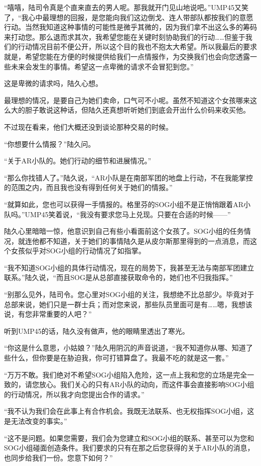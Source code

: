 “嘻嘻，陆司令真是个直来直去的男人呢。那我就开门见山地说吧。”UMP45又笑了，“我心中最理想的回报，是您能向我们这边倒戈、连人带部队都按我们的意愿行动。当然我知道这种事情的可能性是微乎其微的，因为我们拿不出这么多的筹码来打动您。那么退而求其次，我希望您能在关键时刻协助我们的行动……但鉴于我们的行动情况目前不便公开，所以这个目的我也不抱太大希望。所以我最后的要求就是，希望您能在方便的时候提供给我们一点情报作，为交换我们也会向您透露一些未来会发生的事情。希望这一点卑微的请求不会冒犯到您。”

这是卑微的请求吗，陆久心想。

最理想的情况，是要自己为她们卖命，口气可不小呢。虽然不知道这个女孩哪来这么大的胆子敢说这种话，但陆久还真想听听她们到底会开出什么价码来收买他。

不过现在看来，他们大概还没到谈论那种交易的时候。

“你想要什么情报？”陆久问。

“关于AR小队的。她们行动的细节和进展情况。”

“那么你找错人了。”陆久说，“AR小队是在南部军团的地盘上行动，不在我能掌控的范围之内，而且我也没有得到任何关于她们的情报。”

“就算如此，您也可以获得一手情报的。格里芬的SOG小组不是正悄悄跟着AR小队吗。”UMP45笑着说，“我没有要求您马上兑现。只要在合适的时候——”

陆久心里暗暗一惊，他意识到自己有些小看面前这个女孩了。SOG小组的任务情况，就连他都不知道，关于她们的事情陆久是从皮尔斯那里得到的一点消息，而这个女孩似乎对SOG小组的行动情况了如指掌。

“我不知道SOG小组的具体行动情况，现在的局势下，我甚至无法与南部军团建立联系。”陆久说，“而且SOG是从总部直接获取命令的，她们也不归我指挥。”

“别那么见外，陆司令。您心里对SOG小组的关注，我想绝不比总部少。毕竟对于总部来说，她们只是一群士兵；而对您来说，那些队员里面可是有……嗯，我想该说，有您非常重要的人吧？”

听到UMP45的话，陆久没有做声，他的眼睛里透出了寒光。

“你这是什么意思，小姑娘？”陆久用阴沉的声音说道，“我不知道你从哪、知道了些什么，但你要是在胁迫我，你可打错算盘了。我最不吃的就是这一套。”

“万万不敢。我们绝对不希望SOG小组陷入危险，这一点上我和您的立场是完全一致的，请您放心。我们关心的只有AR小队的动向，而这件事会直接影响SOG小组的行动情况，所以我才向您提出合作的请求。”

“我不认为我们会在此事上有合作机会。我既无法联系、也无权指挥SOG小组，这是无法改变的事实。”

“这不是问题。如果您需要，我们会为您建立和SOG小组的联系、甚至可以为您和SOG小组碰面创造条件。我们要求的只有在那之后您获得的关于AR小队的消息，也同步给我们一份。您意下如何？”

